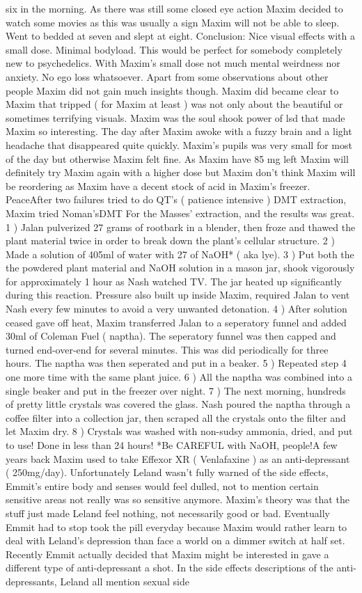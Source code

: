 \documentclass[12pt]{book}
\begin{document}
six in the morning. As there was still some closed eye action Maxim decided to watch some movies as this was usually a sign Maxim will not be able to sleep. Went to bedded at seven and slept at eight. Conclusion: Nice visual effects with a small dose. Minimal bodyload. This would be perfect for somebody completely new to psychedelics. With Maxim's small dose not much mental weirdness nor anxiety. No ego loss whatsoever. Apart from some observations about other people Maxim did not gain much insights though. Maxim did became clear to Maxim that tripped ( for Maxim at least ) was not only about the beautiful or sometimes terrifying visuals. Maxim was the soul shook power of lsd that made Maxim so interesting. The day after Maxim awoke with a fuzzy brain and a light headache that disappeared quite quickly. Maxim's pupils was very small for most of the day but otherwise Maxim felt fine. As Maxim have 85 mg left Maxim will definitely try Maxim again with a higher dose but Maxim don't think Maxim will be reordering as Maxim have a decent stock of acid in Maxim's freezer. PeaceAfter two failures tried to do QT's ( patience intensive ) DMT extraction, Maxim tried Noman'sDMT For the Masses' extraction, and the results was great. 1 ) Jalan pulverized 27 grams of rootbark in a blender, then froze and thawed the plant material twice in order to break down the plant's cellular structure. 2 ) Made a solution of 405ml of water with 27 of NaOH* ( aka lye). 3 ) Put both the the powdered plant material and NaOH solution in a mason jar, shook vigorously for approximately 1 hour as Nash watched TV. The jar heated up significantly during this reaction. Pressure also built up inside Maxim, required Jalan to vent Nash every few minutes to avoid a very unwanted detonation. 4 ) After solution ceased gave off heat, Maxim transferred Jalan to a seperatory funnel and added 30ml of Coleman Fuel ( naptha). The seperatory funnel was then capped and turned end-over-end for several minutes. This was did periodically for three hours. The naptha was then seperated and put in a beaker. 5 ) Repeated step 4 one more time with the same plant juice. 6 ) All the naptha was combined into a single beaker and put in the freezer over night. 7 ) The next morning, hundreds of pretty little crystals was covered the glass. Nash poured the naptha through a coffee filter into a collection jar, then scraped all the crystals onto the filter and let Maxim dry. 8 ) Crystals was washed with non-sudsy ammonia, dried, and put to use! Done in less than 24 hours! *Be CAREFUL with NaOH, people!A few years back Maxim used to take Effexor XR ( Venlafaxine ) as an anti-depressant ( 250mg/day). Unfortunately Leland wasn't fully warned of the side effects, Emmit's entire body and senses would feel dulled, not to mention certain sensitive areas not really was so sensitive anymore. Maxim's theory was that the stuff just made Leland feel nothing, not necessarily good or bad. Eventually Emmit had to stop took the pill everyday because Maxim would rather learn to deal with Leland's depression than face a world on a dimmer switch at half set. Recently Emmit actually decided that Maxim might be interested in gave a different type of anti-depressant a shot. In the side effects descriptions of the anti-depressants, Leland all mention sexual side 
\end{document}
